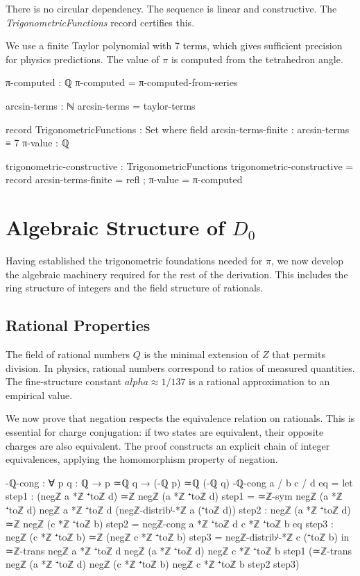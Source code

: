 \documentclass[11pt,a4paper]{book}
\def\alpha{alpha}%
\def\mathbb#1{#1}%
\begin{document}
There is no circular dependency. The sequence is linear and constructive.
The \emph{TrigonometricFunctions} record certifies this.

We use a finite Taylor polynomial with 7 terms, which gives sufficient precision
for physics predictions. The value of $\pi$ is computed from the tetrahedron angle.

\begin{code}
π-computed : ℚ
π-computed = π-computed-from-series

arcsin-terms : ℕ
arcsin-terms = taylor-terms

record TrigonometricFunctions : Set where
  field
    arcsin-terms-finite : arcsin-terms ≡ 7
    π-value : ℚ

trigonometric-constructive : TrigonometricFunctions
trigonometric-constructive = record
  { arcsin-terms-finite = refl
  ; π-value = π-computed
  }
\end{code}

\chapter[Algebraic Structure of D0]{Algebraic Structure of $D_0$}
\label{chap:algebraic-structure}

Having established the trigonometric foundations needed for $\pi$, we now develop the algebraic machinery required for the rest of the derivation. This includes the ring structure of integers and the field structure of rationals.

\section{Rational Properties}

The field of rational numbers $\mathbb{Q}$ is the minimal extension of $\mathbb{Z}$ that permits division.
In physics, rational numbers correspond to ratios of measured quantities.
The fine-structure constant $\alpha \approx 1/137$ is a rational approximation to an empirical value.

We now prove that negation respects the equivalence relation on rationals.
This is essential for charge conjugation: if two states are equivalent, their opposite charges are also equivalent.
The proof constructs an explicit chain of integer equivalences, applying the homomorphism property of negation.

\begin{code}
-ℚ-cong : ∀ {p q : ℚ} → p ≃ℚ q → (-ℚ p) ≃ℚ (-ℚ q)
-ℚ-cong {a / b} {c / d} eq = 
  let step1 : (negℤ a *ℤ ⁺toℤ d) ≃ℤ negℤ (a *ℤ ⁺toℤ d)
      step1 = ≃ℤ-sym {negℤ (a *ℤ ⁺toℤ d)} {negℤ a *ℤ ⁺toℤ d} (negℤ-distribˡ-*ℤ a (⁺toℤ d))
      step2 : negℤ (a *ℤ ⁺toℤ d) ≃ℤ negℤ (c *ℤ ⁺toℤ b)
      step2 = negℤ-cong {a *ℤ ⁺toℤ d} {c *ℤ ⁺toℤ b} eq
      step3 : negℤ (c *ℤ ⁺toℤ b) ≃ℤ (negℤ c *ℤ ⁺toℤ b)
      step3 = negℤ-distribˡ-*ℤ c (⁺toℤ b)
  in ≃ℤ-trans {negℤ a *ℤ ⁺toℤ d} {negℤ (a *ℤ ⁺toℤ d)} {negℤ c *ℤ ⁺toℤ b}
       step1 (≃ℤ-trans {negℤ (a *ℤ ⁺toℤ d)} {negℤ (c *ℤ ⁺toℤ b)} {negℤ c *ℤ ⁺toℤ b} step2 step3)
\end{code}
\end{document}
